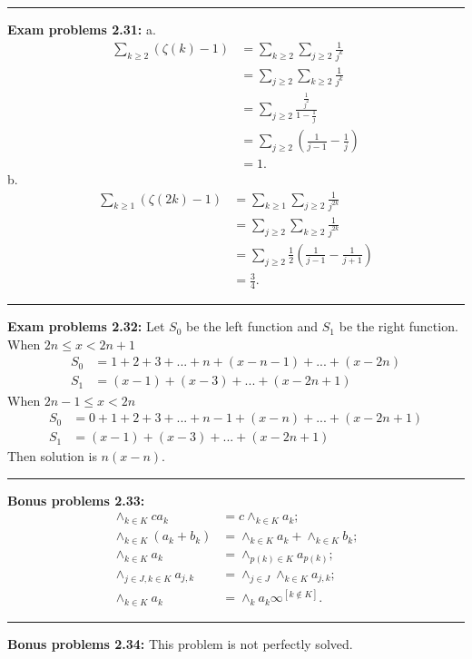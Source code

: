 \documentclass{article}
\begin{document}
\noindent\rule{\textwidth}{0.4pt}
\textbf{Exam problems 2.31:}
a.
\begin{align}
\sum_{k \ge 2} (\zeta(k)-1) &= \sum_{k \ge 2} \sum_{j \ge 2} \frac{1}{j^k} \\
			    &= \sum_{j \ge 2} \sum_{k \ge 2} \frac{1}{j^k}  \\
			    &= \sum_{j \ge 2} \frac{\frac{1}{j^2}}{1 - \frac{1}{j}} \\
			    &= \sum_{j \ge 2} (\frac{1}{j-1} - \frac{1}{j}) \\
			    &= 1.
\end{align}
b.
\begin{align}
\sum_{k \ge 1} (\zeta(2k)-1) &= \sum_{k \ge 1} \sum_{j \ge 2} \frac{1}{j^{2k}} \\
			    &= \sum_{j \ge 2} \sum_{k \ge 2} \frac{1}{j^{2k}}  \\
			    &= \sum_{j \ge 2} \frac{1}{2}(\frac{1}{j-1} - \frac{1}{j+1}) \\
			    &= \frac{3}{4}.
\end{align}

\noindent\rule{\textwidth}{0.4pt}
\textbf{Exam problems 2.32:}
Let $S_0$ be the left function and $S_1$ be the right function.
When $2n \le x < 2n + 1$
\begin{align}
S_0 &= 1 + 2 + 3 + ... + n + (x-n-1) + ... + (x - 2n) \\
S_1 &= (x-1) + (x-3) + ... + (x - 2n + 1)
\end{align}
When $2n-1 \le x < 2n$
\begin{align}
S_0 &= 0 + 1 + 2 + 3 + ... + n-1 + (x-n) + ... + (x - 2n + 1) \\
S_1 &= (x-1) + (x-3) + ... + (x - 2n + 1)
\end{align}
Then solution is $n(x-n)$.

\noindent\rule{\textwidth}{0.4pt}
\textbf{Bonus problems 2.33:}
\begin{align}
\land_{k \in K}c a_k &= c\land_{k \in K} a_k; \\
\land_{k \in K} (a_k + b_k) &= \land_{k \in K}a_k + \land_{k \in K}b_k; \\
\land_{k \in K}a_k &= \land_{p(k) \in K}a_{p(k)}; \\
\land_{j \in J,k\in K} a_{j,k} &= \land_{j \in J} \land_{k \in K} a_{j,k}; \\
\land_{k \in K}a_k &= \land_k a_k \infty^{[k \not\in K]}.
\end{align}

\noindent\rule{\textwidth}{0.4pt}
\textbf{Bonus problems 2.34:}
This problem is not perfectly solved.
\end{document}
